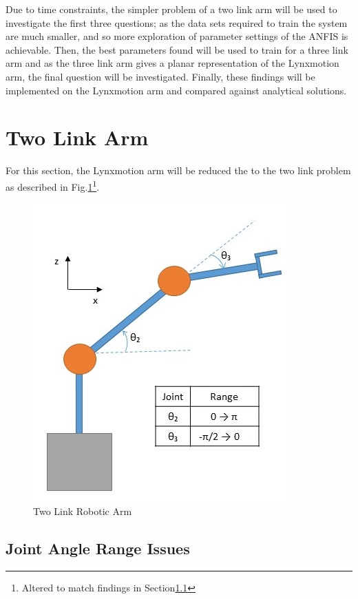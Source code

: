 \documentclass[11.5pt, twoside, a4paper]{article}
\begin{document}
 Due to time constraints, the simpler problem of a two link arm will be used to investigate the first three questions; as the data sets required to train the system are much smaller, and so more exploration of parameter settings of the ANFIS is achievable. Then, the best parameters found will be used to train for a three link arm and as the three link arm gives a planar representation of the Lynxmotion arm, the final question will be investigated. Finally, these findings will be implemented on the Lynxmotion arm and compared against analytical solutions.

\section{Two Link Arm} %

For this section, the Lynxmotion arm will be reduced the to the two link problem as described in Fig.\ref{fig:2Link}\footnote{Altered to match findings in Section\ref{sec:elbowIssues}}. 

\begin{figure} %
\begin{center}
\includegraphics{2Link.jpg}
\caption{Two Link Robotic Arm \label{fig:2Link}}
\end{center}
\end{figure}

\subsection{Joint Angle Range Issues} \label{sec:elbowIssues}
\end{document}
